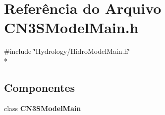 \section{Referência do Arquivo C\+N3\+S\+Model\+Main.\+h}
\label{_c_n3_s_model_main_8h}
{\ttfamily \#include \char`\"{}Hydrology/\+Hidro\+Model\+Main.\+h\char`\"{}}\\*
\subsection*{Componentes}
\begin{DoxyCompactItemize}
\item 
class {\bf C\+N3\+S\+Model\+Main}
\end{DoxyCompactItemize}
